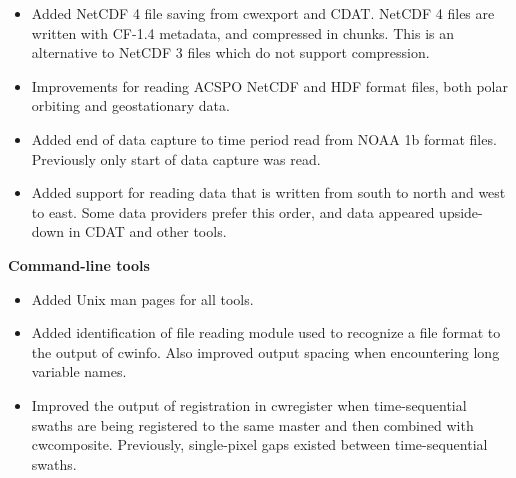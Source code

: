 \begin{itemize}

  \item Added NetCDF 4 file saving from cwexport and CDAT.  NetCDF 4 files are
  written with CF-1.4 metadata, and compressed in chunks.  This is an
  alternative to NetCDF 3 files which do not support compression.

  \item Improvements for reading ACSPO NetCDF and HDF format files, both
  polar orbiting and geostationary data.

  \item Added end of data capture to time period read from NOAA 1b format
  files.  Previously only start of data capture was read.

  \item Added support for reading data that is written from south to north
  and west to east.  Some data providers prefer this order, and data appeared
  upside-down in CDAT and other tools.

\end{itemize}

\hspace{0.4cm} {\bf Command-line tools}

\begin{itemize}

  \item Added Unix man pages for all tools.

  \item Added identification of file reading module used to recognize a file
  format to the output of cwinfo.  Also improved output spacing when
  encountering long variable names.

  \item Improved the output of registration in cwregister when time-sequential
  swaths are being registered to the same master and then combined with
  cwcomposite.  Previously, single-pixel gaps existed between time-sequential
  swaths.

\end{itemize}

